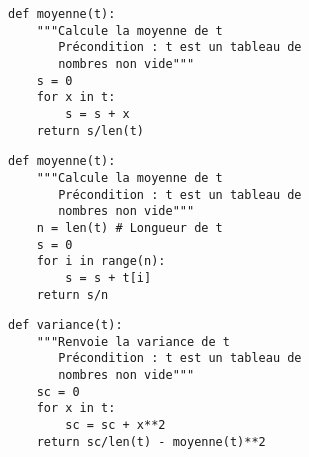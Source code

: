 \exer{}
\setcounter{numques}{0}


\begin{lstlisting}
def moyenne(t):
    """Calcule la moyenne de t
       Précondition : t est un tableau de 
       nombres non vide"""
    s = 0 
    for x in t:
        s = s + x 
    return s/len(t)
\end{lstlisting}

\begin{lstlisting}
def moyenne(t):
    """Calcule la moyenne de t
       Précondition : t est un tableau de 
       nombres non vide"""
    n = len(t) # Longueur de t
    s = 0 
    for i in range(n):
        s = s + t[i]
    return s/n 
\end{lstlisting}


\begin{lstlisting}
def variance(t):
    """Renvoie la variance de t
       Précondition : t est un tableau de 
       nombres non vide"""
    sc = 0
    for x in t:
        sc = sc + x**2 
    return sc/len(t) - moyenne(t)**2
\end{lstlisting}



